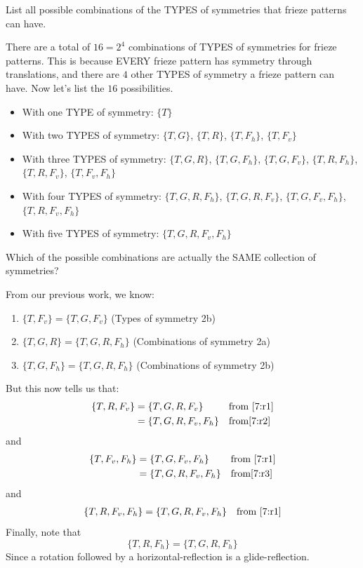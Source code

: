 \documentclass[noauthor,nooutcomes,hints,handout]{ximera}
\begin{document}
\mynewpage


\begin{question}
  List all possible combinations of the TYPES of symmetries that
  frieze patterns can have.
  \begin{freeResponse}
    There are a total of $16 = 2^4$ combinations of TYPES of
    symmetries for frieze patterns. This is because EVERY frieze
    pattern has symmetry through translations, and there are $4$ other
    TYPES of symmetry a frieze pattern can have.  Now let's list the
    $16$ possibilities.
    \begin{itemize}
    \item With one TYPE of symmetry: $\{T\}$
    \item With two TYPES of symmetry: $\{T,G\}$, $\{T,R\}$, $\{T,F_h\}$, $\{T,F_v\}$
    \item With three TYPES of symmetry: $\{T,G,R\}$, $\{T,G,F_h\}$, $\{T,G,F_v\}$, $\{T,R,F_h\}$, $\{T,R,F_v\}$, $\{T,F_v,F_h\}$
    \item With four TYPES of symmetry:  $\{T,G,R,F_h\}$, $\{T,G,R,F_v\}$, $\{T,G,F_v,F_h\}$, $\{T,R,F_v,F_h\}$
    \item With five TYPES of symmetry: $\{T,G,R,F_v,F_h\}$
    \end{itemize}
  \end{freeResponse}
\end{question}
\mynewpage

\begin{question}
  Which of the possible combinations are actually the SAME collection
  of symmetries?
  \begin{freeResponse}
    From our previous work, we know:
    \begin{enumerate}
    \item\label{7:r1} $\{T,F_v\} = \{T,G,F_v\}$ (Types of symmetry 2b)
    \item\label{7:r2} $\{T,G,R\} = \{T,G,R,F_h\}$ (Combinations of symmetry 2a)
    \item\label{7:r3} $\{T,G,F_h\} = \{T,G,R,F_h\}$ (Combinations of symmetry 2b)
    \end{enumerate}
    But this now tells us that:
    \begin{align*}
      \{T,R,F_v\} &= \{T,G,R,F_v\} & &\text{from \ref{7:r1}}\\
      &= \{T,G,R,F_v,F_h\} & &\text{from\ref{7:r2}}
    \end{align*}
    and
    \begin{align*}
      \{T,F_v,F_h\} &= \{T,G,F_v,F_h\}& &\text{from \ref{7:r1}} \\
      &= \{T,G,R,F_v,F_h\} & &\text{from\ref{7:r3}}
    \end{align*}
    and
    \begin{align*}
      \{T,R,F_v,F_h\} &= \{T,G,R,F_v,F_h\} & &\text{from \ref{7:r1}}\\
    \end{align*}
    Finally, note that
    \[
    \{T,R,F_h\} = \{T,G,R,F_h\}
    \]
    Since a rotation followed by a horizontal-reflection is a
    glide-reflection.
  \end{freeResponse}
\end{question}
\mynewpage
\end{document}
